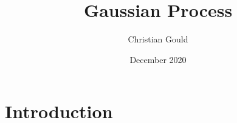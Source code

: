 \documentclass{article}
\title{Gaussian Process}
\author{Christian Gould}
\date{December 2020}
\begin{document}
\maketitle

\section{Introduction}
\end{document}
